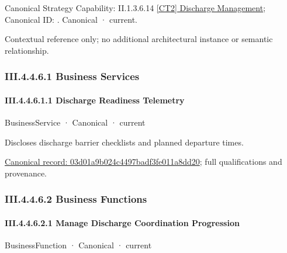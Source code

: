 {\small Canonical Strategy Capability: II.1.3.6.14 \hyperref[element:ec5e8d6732764aa489c2dd7630fc8fef]{[CT2] Discharge Management}; Canonical ID: \texttt{}. Canonical · current.}\par
Contextual reference only; no additional architectural instance or semantic relationship.\par
\subsubsection*{III.4.4.6.1 Business Services}
\label{navigation:III.4.4.6.1}

\paragraph*{III.4.4.6.1.1 Discharge Readiness Telemetry}
\label{navigation:III.4.4.6.1.1}

\label{element:03d01a9b024c4497badf3fe011a8dd20}
{\small BusinessService · Canonical · current}\par

Discloses discharge barrier checklists and planned departure times.


{\footnotesize \href{../../../../../../../continuum/business/business-service/03d01a9b024c4497badf3fe011a8dd20.md}{Canonical record: 03d01a9b024c4497badf3fe011a8dd20}; full qualifications and provenance.}\par
\subsubsection*{III.4.4.6.2 Business Functions}
\label{navigation:III.4.4.6.2}

\paragraph*{III.4.4.6.2.1 Manage Discharge Coordination Progression}
\label{navigation:III.4.4.6.2.1}

\label{element:ecda6d08166d4df78c15c87387fbe108}
{\small BusinessFunction · Canonical · current}\par

